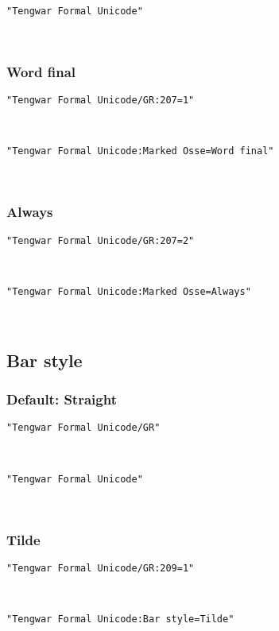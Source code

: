 \documentclass[11pt,a4paper]{article}
\begin{document}
\formalGR 

\noindent \texttt{"Tengwar Formal Unicode"}

\formalAAT 

\subsubsection{Word final}

\texttt{"Tengwar Formal Unicode/GR:207=1"}

\formalGRossefinal 

\noindent \texttt{"Tengwar Formal Unicode:Marked Osse=Word final"}

\formalAATossefinal 

\subsubsection{Always}

\texttt{"Tengwar Formal Unicode/GR:207=2"}

\formalGRossealways 

\noindent \texttt{"Tengwar Formal Unicode:Marked Osse=Always"}

\formalAATossealways 


\subsection{Bar style}

\subsubsection{Default: Straight}

\texttt{"Tengwar Formal Unicode/GR"}

\formalGR 

\noindent \texttt{"Tengwar Formal Unicode"}

\formalAAT 

\subsubsection{Tilde}

\texttt{"Tengwar Formal Unicode/GR:209=1"}

\formalGRtilde 

\noindent \texttt{"Tengwar Formal Unicode:Bar style=Tilde"}

\formalAATtilde 
\end{document}
